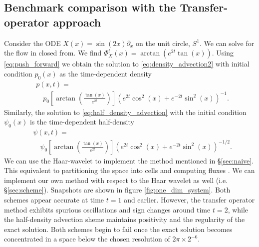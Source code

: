 \documentclass[letterpaper, 12 pt]{amsart}
\begin{document}
\subsection{Benchmark comparison with the Transfer-operator approach}
Consider the ODE $X(x) = \sin(2x) \partial_x$ on the unit circle, $S^1$.
We can solve for the flow in closed from.  We find
$\Phi_X^t(x) = \arctan( e^{2t} \tan(x) )$.
Using \eqref{eq:push_forward}
we obtain the solution to \eqref{eq:density_advection2} with initial condition $p_0(x)$ as the time-dependent density
\begin{align*}
  &p(x,t) = \\
  &\quad p_0\left[ \arctan \left( \frac{ \tan(x)}{e^{2t}} \right)\right]
  \left( e^{2t} \cos^2(x) + e^{-2t} \sin^2(x)  \right)^{-1}.
\end{align*}
Similarly, the solution to \eqref{eq:half_density_advection} with the initial condition $\psi_0(x)$ is the time-dependent half-density
\begin{align*}
  &\psi(x,t) = \\
  &\quad \psi_0\left[\arctan\left( \frac{ \tan(x)}{e^{2t}} \right) \right]
  \left( e^{2t} \cos^2(x) + e^{-2t} \sin^2(x) \right)^{-1/2}. 
\end{align*}
We can use the Haar-wavelet to implement the method mentioned in \S \ref{sec:naive}.  This equivalent to partitioning the space into cells and computing fluxes \cite{FroylandJungeKoltai2013}.  We can implement our own method with respect to the Haar wavelet as well (i.e. \S \ref{sec:scheme}).  Snapshots are shown in figure \ref{fig:one_dim_system}.
Both schemes appear accurate at time $t=1$ and earlier.
However, the transfer operator method exhibits spurious oscillations and sign changes around time $t=2$,
 while the half-density advection sheme maintains positivity and the regularity of the exact solution.
Both schemes begin to fail once the exact solution becomes concentrated in a space below the chosen resolution of $2\pi \times 2^{-6}$.
\end{document}
